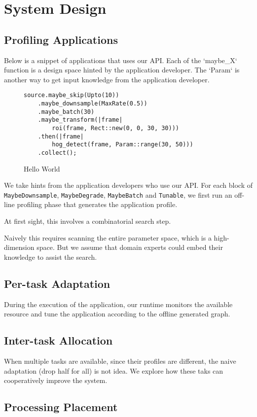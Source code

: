 \section{System Design}
\label{sec:system-design}

\subsection{Profiling Applications}
\label{sec:prof-appl}

Below is a snippet of applications that uses our API. Each of the `maybe\_X`
function is a design space hinted by the application developer. The `Param` is
another way to get input knowledge from the application developer.

\begin{figure}
  \begin{lstlisting}
source.maybe_skip(Upto(10))
    .maybe_downsample(MaxRate(0.5))
    .maybe_batch(30)
    .maybe_transform(|frame|
        roi(frame, Rect::new(0, 0, 30, 30)))
    .then(|frame|
        hog_detect(frame, Param::range(30, 50)))
    .collect();
  \end{lstlisting}
  \caption{Hello World}
  \label{fig:code}
\end{figure}

We take hints from the application developers who use our API. For each block of
\texttt{MaybeDownsample}, \texttt{MaybeDegrade}, \texttt{MaybeBatch} and
\texttt{Tunable}, we first run an off-line profiling phase that generates the
application profile.

At first sight, this involves a combinatorial search step.

Naively this requires scanning the entire parameter space, which is a
high-dimension space. But we assume that domain experts could embed their
knowledge to assist the search.

\subsection{Per-task Adaptation}
\label{sec:per-task-adaptation}

During the execution of the application, our runtime monitors the available
resource and tune the application according to the offline generated graph.

\subsection{Inter-task Allocation}
\label{sec:inter-task-alloc}

When multiple tasks are available, since their profiles are different, the naive
adaptation (drop half for all) is not idea. We explore how these taks can
cooperatively improve the system.

\subsection{Processing Placement}
\label{sec:processing-placement}

